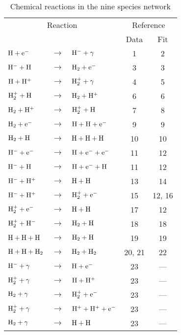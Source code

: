 \begin{table}
\caption{Chemical reactions in the nine species network \label{tab:nine}}
\begin{tabular}{lclcc}
\hline
\multicolumn{3}{c}{Reaction} & \multicolumn{2}{c}{Reference} \\
& & & Data & Fit \\
\hline
${\rm H + e^{-}}$ & $\rightarrow$ & ${\rm H^{-} + \gamma}$ & 1 & 2 \\
${\rm H^{-} + H}$ & $\rightarrow$ & ${\rm H_{2} + e^{-}}$ & 3 & 3 \\
${\rm H + H^{+}}$ & $\rightarrow$ & ${\rm H_{2}^{+} + \gamma}$ & 4 & 5 \\
${\rm H_{2}^{+} + H}$ & $\rightarrow$ & ${\rm H_{2} + H^{+}}$ & 6 & 6 \\
${\rm H_{2} + H^{+}}$ & $\rightarrow$ & ${\rm H_{2}^{+} + H}$ & 7 & 8 \\
${\rm H_{2} + e^{-}}$ & $\rightarrow$ & ${\rm H + H + e^{-}}$ & 9 & 9 \\
${\rm H_{2} + H}$ & $\rightarrow$ & ${\rm H + H + H}$ & 10 & 10 \\
${\rm H^{-} + e^{-}}$ & $\rightarrow$ & ${\rm H + e^{-} + e^{-}}$ & 11 & 12 \\
${\rm H^{-} + H}$ & $\rightarrow$ & ${\rm H + e^{-} + H}$ & 11 & 12 \\
${\rm H^{-} + H^{+}}$ & $\rightarrow$ & ${\rm H + H}$ & 13 & 14 \\
${\rm H^{-} + H^{+}}$ & $\rightarrow$ & ${\rm H_{2}^{+} + e^{-}}$ & 15 & 12, 16 \\
${\rm H_{2}^{+} + e^{-}}$ & $\rightarrow$ & ${\rm H + H}$ & 17 & 12 \\
${\rm H_{2}^{+} + H^{-}}$ & $\rightarrow$ & ${\rm H_{2} + H}$ & 18 & 18 \\ 
${\rm H + H + H}$ & $\rightarrow$ & ${\rm H_{2} + H}$ & 19  & 19  \\
${\rm H + H + H_{2}}$ & $\rightarrow$ & ${\rm H_{2} + H_{2}}$ & 20, 21 & 22 \\
${\rm H^{-} + \gamma}$ & $\rightarrow$ & ${\rm H + e^{-}}$ & 23 & --- \\
${\rm H_{2}^{+} + \gamma}$ & $\rightarrow$ & ${\rm H + H^{+}}$ & 23 & --- \\
${\rm H_{2} + \gamma}$ & $\rightarrow$ & ${\rm H_{2}^{+} + e^{-}}$ & 23 & --- \\
${\rm H_{2}^{+} + \gamma}$ & $\rightarrow$ & ${\rm H^{+} + H^{+} + e^{-}}$ & 23 & --- \\
${\rm H_{2} + \gamma}$ & $\rightarrow$ & ${\rm H + H}$ & 23 & --- \\

\end{tabular}
\end{table}
